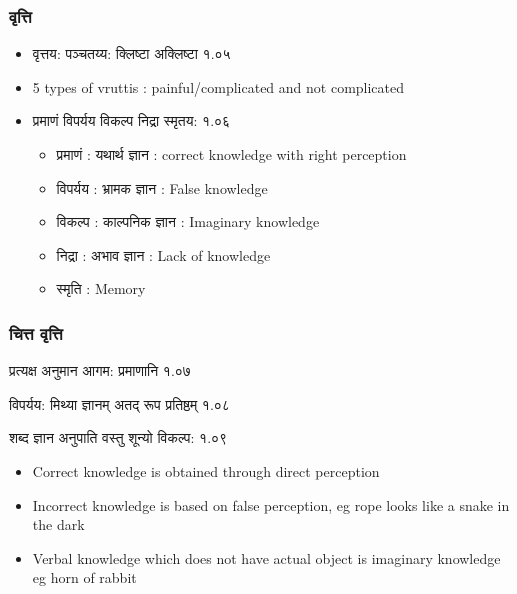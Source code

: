 \begin{frame}[fragile]\frametitle{वृत्ति}

	\begin{itemize}
	\item वृत्तय: पञ्चतय्य: क्लिष्टा अक्लिष्टा १.०५
	\item 5 types of vruttis : painful/complicated and not complicated
	\item प्रमाणं विपर्यय विकल्प निद्रा स्मृतय: १.०६
		\begin{itemize}
		\item प्रमाणं : यथार्थ ज्ञान : correct knowledge with right perception
		\item विपर्यय : भ्रामक ज्ञान : False knowledge
		\item विकल्प : काल्पनिक ज्ञान : Imaginary knowledge
		\item निद्रा : अभाव ज्ञान : Lack of knowledge
		\item स्मृति : Memory
		
		\end{itemize}	
	\end{itemize}

\end{frame}

\begin{frame}[fragile]\frametitle{चित्त वृत्ति}

\begin{sanskrit}
प्रत्यक्ष अनुमान आगम: प्रमाणानि १.०७

विपर्यय: मिथ्या ज्ञानम् अतद् रूप प्रतिष्ठम् १.०८

शब्द ज्ञान अनुपाति वस्तु शून्यो विकल्प: १.०९
\end{sanskrit}


	\begin{itemize}
	\item Correct knowledge is obtained through direct perception
	\item Incorrect knowledge is based on false perception, eg rope looks like a snake in the dark
	\item Verbal knowledge which does not have actual object is imaginary knowledge eg horn of rabbit
	\end{itemize}

\end{frame}
